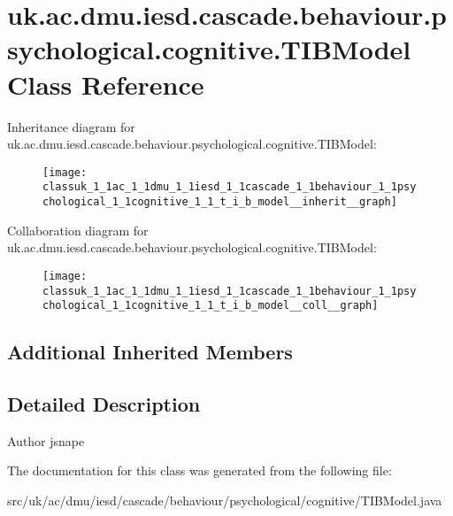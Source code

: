 \hypertarget{classuk_1_1ac_1_1dmu_1_1iesd_1_1cascade_1_1behaviour_1_1psychological_1_1cognitive_1_1_t_i_b_model}{\section{uk.\-ac.\-dmu.\-iesd.\-cascade.\-behaviour.\-psychological.\-cognitive.\-T\-I\-B\-Model Class Reference}
\label{classuk_1_1ac_1_1dmu_1_1iesd_1_1cascade_1_1behaviour_1_1psychological_1_1cognitive_1_1_t_i_b_model}
}


Inheritance diagram for uk.\-ac.\-dmu.\-iesd.\-cascade.\-behaviour.\-psychological.\-cognitive.\-T\-I\-B\-Model\-:\nopagebreak
\begin{figure}[H]
\begin{center}
\leavevmode
\texttt{[image: classuk\_1\_1ac\_1\_1dmu\_1\_1iesd\_1\_1cascade\_1\_1behaviour\_1\_1psychological\_1\_1cognitive\_1\_1\_t\_i\_b\_model\_\_inherit\_\_graph]}
\end{center}
\end{figure}


Collaboration diagram for uk.\-ac.\-dmu.\-iesd.\-cascade.\-behaviour.\-psychological.\-cognitive.\-T\-I\-B\-Model\-:\nopagebreak
\begin{figure}[H]
\begin{center}
\leavevmode
\texttt{[image: classuk\_1\_1ac\_1\_1dmu\_1\_1iesd\_1\_1cascade\_1\_1behaviour\_1\_1psychological\_1\_1cognitive\_1\_1\_t\_i\_b\_model\_\_coll\_\_graph]}
\end{center}
\end{figure}
\subsection*{Additional Inherited Members}


\subsection{Detailed Description}
\begin{DoxyAuthor}{Author}
jsnape 
\end{DoxyAuthor}


The documentation for this class was generated from the following file\-:\begin{DoxyCompactItemize}
\item 
src/uk/ac/dmu/iesd/cascade/behaviour/psychological/cognitive/T\-I\-B\-Model.\-java\end{DoxyCompactItemize}
